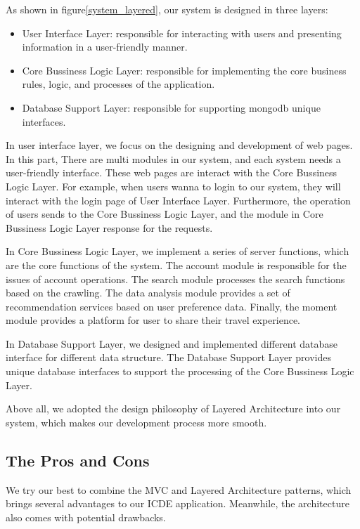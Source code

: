 \documentclass[conference]{IEEEtran}
\begin{document}
As shown in figure\ref{system_layered}, our system is designed in three layers: 

\begin{itemize}
    \item User Interface Layer: responsible for interacting with users and presenting information in a user-friendly manner.

    \item Core Bussiness Logic Layer: responsible for implementing the core business rules, logic, and processes of the application.

    \item Database Support Layer: responsible for supporting mongodb unique interfaces.
\end{itemize}


In user interface layer, we focus on the designing and development of web pages. In this part,  There are multi modules in our system, and each system needs a user-friendly interface. These web pages are interact with the Core Bussiness Logic Layer. For example, when users wanna to login to our system, they will interact with the login page of User Interface Layer. Furthermore, the operation of users sends to the Core Bussiness Logic Layer, and the module in Core Bussiness Logic Layer response for the requests.

In Core Bussiness Logic Layer, we implement a series of server functions, which are the core functions of the system. The account module is responsible for the issues of account operations. The search module processes the search functions based on the crawling. The data analysis module provides a set of recommendation services based on user preference data. Finally, the moment module provides a platform for user to share their travel experience.

In Database Support Layer, we designed and implemented different database interface for different data structure. The Database Support Layer provides unique database interfaces to support the processing of the Core Bussiness Logic Layer.

Above all, we adopted the design philosophy of Layered Architecture into our system, which makes our development process more smooth.


\subsection{\textbf{The Pros and Cons}}

We try our best to combine the MVC and Layered Architecture patterns, which brings several advantages to our ICDE application. Meanwhile, the architecture also comes with potential drawbacks.
\end{document}
